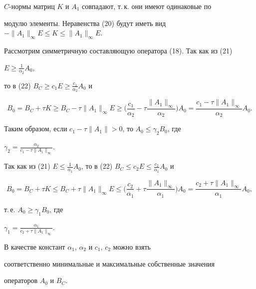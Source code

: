 \begin{pf} 


$C$-нормы матриц $K$ и $A_1$ совпадают, т.\,к. они имеют одинаковые по 


модулю элементы. Неравенства (20) будут иметь вид $-\|A_1\|_\infty E\le 


K\le\|A_1\|_\infty E$. 


 


Рассмотрим симметричную составляющую оператора (18). Так как из (21)\; 


$E\ge\frac{1}{\alpha_2}A_0$, 


то в (22)\; $B_C\ge c_1E\ge\frac{c_1}{\alpha_2}A_0$ и 


$$ 


B_0=B_C+\tau K\ge B_C-\tau\|A_1\|_\infty E\ge 


\bigg(\frac{c_1}{\alpha_2}-\tau\frac{\|A_1\|_\infty}{\alpha_2} 


\bigg)A_0=\frac{c_1-\tau\|A_1\|_\infty}{\alpha_2}A_0. 


$$ 


Таким образом, если $c_1-\tau\|A_1\|>0$, то $A_0\le\gamma_2B_0$, где 


$\gamma_2=\frac{\alpha_2}{c_1-\tau\|A_1\|_\infty}$. 


Так как из (21)\; $E\le\frac{1}{\alpha_1}A_0$, то в (22)\; $B_C\le 


c_2E\le\frac{c_2}{\alpha_1}A_0$ и 


$$ 


B_0=B_C+\tau K\le B_C+\tau\|A_1\|_\infty E\le 


\bigg(\frac{c_2}{\alpha_1}+\tau\frac{\|A_1\|_\infty}{\alpha_1} 


\bigg)A_0=\frac{c_2+\tau\|A_1\|_\infty}{\alpha_1}A_0, 


$$ 


т.\,е. $A_0\ge\gamma_1B_0$, где 


$\gamma_1=\frac{\alpha_1}{c_2+\tau\|A_1\|_\infty}$. 


\end{pf} 


 


\begin{notenonum} 


В качестве констант $\alpha_1$, $\alpha_2$ и $c_1$, $c_2$ можно взять 


соответственно минимальные и максимальные собственные значения 


операторов $A_0$ и $B_C$. 


\end{notenonum} 


